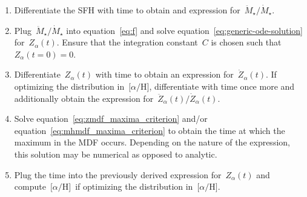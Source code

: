 \documentclass[12pt]{article}
\newcommand{\ah}{\ensuremath{\text{[$\alpha$/H]}}}
\begin{document}
\begin{enumerate}

	\item Differentiate the SFH with time to obtain and expression
	for~$\ddot{M}_\star / \dot{M}_\star$.

	\item Plug~$\ddot{M}_\star / \dot{M}_\star$ into equation~\ref{eq:f} and
	solve equation~\ref{eq:generic-ode-solution} for~$Z_\alpha(t)$.
	Ensure that the integration constant~$C$ is chosen such
	that~$Z_\alpha(t = 0) = 0$.

	\item Differentiate~$Z_\alpha(t)$ with time to obtain an expression
	for~$\dot{Z}_\alpha(t)$.
	If optimizing the distribution in~\ah, differentiate with time once more
	and additionally obtain the expression
	for~$\ddot{Z}_\alpha(t) / \dot{Z}_\alpha(t)$.

	\item Solve equation~\ref{eq:zmdf_maxima_criterion} and/or
	equation~\ref{eq:mhmdf_maxima_criterion} to obtain the time at which the
	maximum in the MDF occurs.
	Depending on the nature of the expression, this solution may be numerical
	as opposed to analytic.

	\item Plug the time into the previously derived expression for~$Z_\alpha(t)$
	and compute~\ah~if optimizing the distribution in~\ah.

\end{enumerate}
\end{document}
